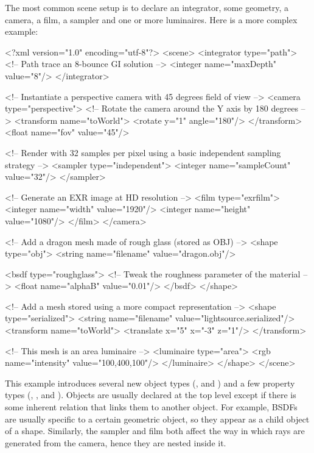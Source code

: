 The most common scene setup is to declare an integrator, some geometry, a camera, a film, a sampler  
and one or more luminaires. Here is a more complex example:
\begin{xml}
<?xml version="1.0" encoding="utf-8"?>
<scene>
	<integrator type="path"> <!-- Path trace an 8-bounce GI solution -->
		<integer name="maxDepth" value="8"/>
	</integrator>

	
	<!-- Instantiate a perspective camera with 45 degrees field of view -->
	<camera type="perspective">
		<!-- Rotate the camera around the Y axis by 180 degrees -->
		<transform name="toWorld">
			<rotate y="1" angle="180"/>
		</transform>
		<float name="fov" value="45"/>

		<!-- Render with 32 samples per pixel using a basic
             independent sampling strategy -->
		<sampler type="independent">
			<integer name="sampleCount" value="32"/>
		</sampler>

		<!-- Generate an EXR image at HD resolution -->
		<film type="exrfilm">
			<integer name="width" value="1920"/>
			<integer name="height" value="1080"/>
		</film>
	</camera>

	<!-- Add a dragon mesh made of rough glass (stored as OBJ) -->
	<shape type="obj">
		<string name="filename" value="dragon.obj"/>

		<bsdf type="roughglass">
			<!-- Tweak the roughness parameter of the material -->
			<float name="alphaB" value="0.01"/>
		</bsdf>
	</shape>

	<!-- Add a mesh stored using a more compact representation -->
	<shape type="serialized">
		<string name="filename" value="lightsource.serialized"/>
		<transform name="toWorld">
			<translate x="5" x="-3" z="1"/>
		</transform>

		<!-- This mesh is an area luminaire -->
		<luminaire type="area">
			<rgb name="intensity" value="100,400,100"/>
		</luminaire>
	</shape>
</scene>
\end{xml}
This example introduces several new object types (, and )
and a few property types (, , and ). 
Objects are usually declared at the top level except if there is some
inherent relation that links them to another object. For example, BSDFs are usually specific to a certain geometric object, so 
they appear as a child object of a shape. Similarly, the sampler and film both affect the way in which
rays are generated from the camera, hence they are nested inside it.


